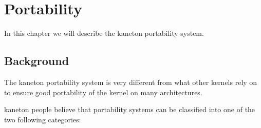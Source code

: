 %
%
%
%
%
%

%
%

\chapter{Portability}
\label{chapter:portability}

In this chapter we will describe the kaneton portability system.

\newpage

%
%

%
%

\section{Background}

The kaneton portability system is very different from what other kernels
rely on to ensure good portability of the kernel on many architectures.

kaneton people believe that portability systems can be classified into one
of the two following categories:

